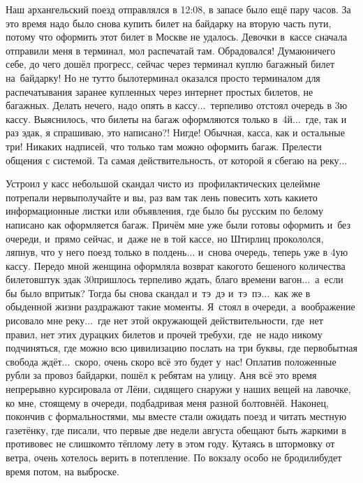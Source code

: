 Наш архангельский поезд отправлялся в 12:08, в запасе было ещё пару часов. За это время надо было снова купить билет на байдарку на вторую часть пути, потому что оформить этот билет в Москве не удалось. Девочки в~кассе сначала отправили меня в терминал, мол распечатай там. Обрадовался! Думаю\mdash ничего себе, до чего дошёл прогресс, сейчас через терминал куплю багажный билет на~байдарку! Но не тут\sdash то было\mdash терминал оказался просто терминалом для распечатывания заранее купленных через интернет простых билетов, не багажных. Делать нечего, надо опять в кассу$\ldots$~терпеливо отстоял очередь в 3\sdash ю кассу. Выяснилось, что билеты на багаж оформляются только в~4\sdash й$\ldots$~где, так и раз эдак, я спрашиваю, это написано?! Нигде! Обычная, касса, как и остальные три! Никаких надписей, что только там можно оформить багаж. Прелести общения с системой. Та самая действительность, от которой я сбегаю на реку$\ldots$

Устроил у касс небольшой скандал чисто из~профилактических целей\mdash мне потрепали нервы\mdash получайте и вы, раз вам так лень повесить хоть какие\sdash то информационные листки или объявления, где было бы русским по белому написано как оформляется багаж. Причём мне уже были готовы оформить и~без очереди, и~прямо сейчас, и~даже не в той кассе, но Штирлиц прокололся, ляпнув, что у него поезд только в полдень$\ldots$ и~снова очередь, теперь уже в 4\sdash ую кассу. Передо мной женщина оформляла возврат какого\sdash то бешеного количества билетов\mdash штук эдак 30\mdash пришлось терпеливо ждать, благо времени вагон$\ldots$~а~если бы было впритык? Тогда бы снова скандал и~тэ~дэ и~тэ~пэ$\ldots$~как же в обыденной жизни раздражают такие моменты. Я~стоял в очереди, а~воображение рисовало мне реку$\ldots$~где нет этой окружающей действительности, где~нет правил, нет этих дурацких билетов и прочей требухи, где~не надо никому подчиняться, где можно всю цивилизацию послать на три буквы, где первобытная свобода ждёт$\ldots$~скоро, очень скоро всё это будет у~нас!
\newpage
Оплатив положенные рубли за провоз байдарки, пошёл к ребятам на улицу. Аня всё это время непрерывно курсировала от Лёни, сидящего снаружи у наших вещей на лавочке, ко мне, стоящему в очереди, подбадривая меня разной болтовнёй. Наконец, покончив с формальностями, мы вместе стали ожидать поезд и читать местную газетёнку, где писали, что первые две недели августа обещают быть жаркими в противовес не слишком\sdash то тёплому лету в этом году. Кутаясь в штормовку от ветра, очень хотелось верить в потепление. По вокзалу особо не бродили\mdash будет время потом, на выброске.
 
